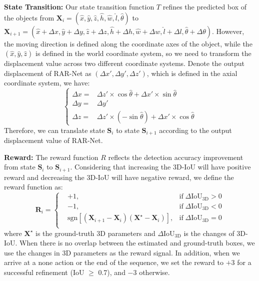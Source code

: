\documentclass[runningheads]{llncs}
\begin{document}
\noindent
\textbf{State Transition:} Our state transition function ${T}$ refines the predicted box of the objects from $\mathbf{X}_i= (\hat{x}, \hat{y}, \hat{z}, \hat{h}, \hat{w}, \hat{l},\hat{\theta})$ to $\mathbf{X}_{i+1}= (\hat{x}+\Delta x, \hat{y}+\Delta y, \hat{z}+\Delta z, \hat{h}+\Delta h, \hat{w}+\Delta w, \hat{l}+\Delta l, \hat{\theta}+\Delta \theta)$. However, the moving direction is defined along the coordinate axes of the object, while the $(\hat{x}, \hat{y}, \hat{z})$ is defined in the world coordinate system, so we need to transform the displacement value across two different coordinate systems. Denote the output displacement of RAR-Net as $(\Delta x', \Delta y', \Delta z')$, which is defined in the axial coordinate system, we have:
\begin{equation}
\left\{
\begin{aligned}
    	\Delta x =& \Delta z' \times \cos\hat{\theta} +  \Delta x' \times \sin\hat{\theta}\\
	\Delta y =& \Delta y'   \\
	\Delta z =& \Delta z' \times (-\sin\hat{\theta}) +  \Delta x' \times \cos\hat{\theta}
\end{aligned}
\right.
\end{equation}
Therefore, we can translate state $\mathbf{S}_i$ to state $\mathbf{S}_{i+1}$ according to the output displacement value of RAR-Net.

\noindent
\textbf{Reward:} The reward function ${R}$ reflects the detection accuracy improvement from state $\mathbf{S}_i$ to $\mathbf{S}_{i+1}$. Considering that increasing the 3D-IoU will have positive reward and decreasing the 3D-IoU will have negative reward, we define the reward function as:
\begin{equation}
\mathbf{R}_i=
\left\{
\begin{aligned}
    	&+1,&\mathrm{if}\;\Delta \mathrm{IoU}_\mathrm{3D} > 0\\
	&-1,&\mathrm{if}\;\Delta \mathrm{IoU}_\mathrm{3D} < 0\\
	&\mathrm{sgn}[(\mathbf{X}_{i+1}-\mathbf{X}_i)({\mathbf{X}}^{\star}-\mathbf{X}_i)],&\mathrm{if}\;\Delta \mathrm{IoU}_\mathrm{3D} = 0\\
\end{aligned}
\right.
\end{equation}
where ${\mathbf{X}}^{\star}$ is the ground-truth 3D parameters and $\Delta \mathrm{IoU}_\mathrm{3D}$ is the changes of 3D-IoU. When there is no overlap between the estimated and ground-truth boxes, we use the changes in 3D parameters as the reward signal. In addition, when we arrive at a none action or the end of the sequence, we set the reward to $+3$ for a successful refinement (IoU $\geq$ 0.7), and $-3$ otherwise.
\end{document}
